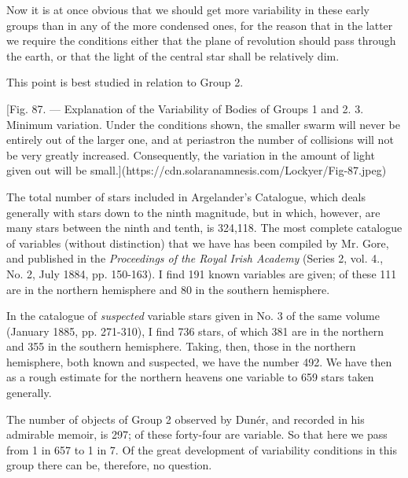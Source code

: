 \documentclass[a4paper, 12pt, oneside, polutonikogreek, english]{article}
\begin{document}
Now it is at once obvious that we should get more variability in these early groups than in any of the more condensed ones, for the reason that in the latter we require the conditions either that the plane of revolution should pass through the earth, or that the light of the central star shall be relatively dim.

This point is best studied in relation to Group 2.

[Fig. 87. --- Explanation of the Variability of Bodies of Groups 1 and 2. 3. Minimum variation. Under the conditions shown, the smaller swarm will never be entirely out of the larger one, and at periastron the number of collisions will not be very greatly increased. Consequently, the variation in the amount of light given out will be small.](https://cdn.solaranamnesis.com/Lockyer/Fig-87.jpeg)

The total number of stars included in Argelander's Catalogue, which deals generally with stars down to the ninth magnitude, but in which, however, are many stars between the ninth and tenth, is 324,118. The most complete catalogue of variables (without distinction) that we have has been compiled by Mr. Gore, and published in the \emph{Proceedings of the Royal Irish Academy} (Series 2, vol. 4., No. 2, July 1884, pp. 150-163). I find 191 known variables are given; of these 111 are in the northern hemisphere and 80 in the southern hemisphere.

In the catalogue of \emph{suspected} variable stars given in No. 3 of the same volume (January 1885, pp. 271-310), I find 736 stars, of which 381 are in the northern and 355 in the southern hemisphere. Taking, then, those in the northern hemisphere, both known and suspected, we have the number 492. We have then as a rough estimate for the northern heavens one variable to 659 stars taken generally.

The number of objects of Group 2 observed by Dunér, and recorded in his admirable memoir, is 297; of these forty-four are variable. So that here we pass from 1 in 657 to 1 in 7. Of the great development of variability conditions in this group there can be, therefore, no question.
\end{document}
